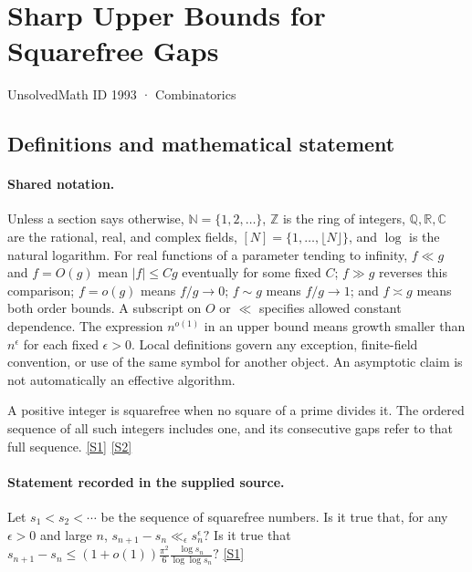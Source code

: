\documentclass[11pt,a4paper]{article}
\newcommand{\N}{\mathbb{N}}
\newcommand{\Z}{\mathbb{Z}}
\newcommand{\Q}{\mathbb{Q}}
\newcommand{\R}{\mathbb{R}}
\newcommand{\C}{\mathbb{C}}
\newcommand{\sref}[2]{\hyperlink{source:#1:#2}{[S#2]}}
\begin{document}

\setcounter{section}{1992}

\section{Sharp Upper Bounds for Squarefree Gaps}\label{1993}

{\small\sffamily UnsolvedMath ID 1993 · Combinatorics}

\subsection{Definitions and mathematical statement}

\paragraph{Shared notation.}Unless a section says otherwise, $\N=\{1,2,\ldots\}$,
$\Z$ is the ring of integers, $\Q,\R,\C$ are the rational, real, and complex
fields, $[N]=\{1,\ldots,\lfloor N\rfloor\}$, and $\log$ is the natural
logarithm. For real functions of a parameter tending to infinity,
$f\ll g$ and $f=O(g)$ mean $|f|\leq Cg$ eventually for some fixed $C$;
$f\gg g$ reverses this comparison; $f=o(g)$ means $f/g\to0$;
$f\sim g$ means $f/g\to1$; and $f\asymp g$ means both order bounds.
A subscript on $O$ or $\ll$ specifies allowed constant dependence.
The expression $n^{o(1)}$ in an upper bound means growth smaller than
$n^\epsilon$ for each fixed $\epsilon>0$. Local definitions govern any
exception, finite-field convention, or use of the same symbol for another
object. An asymptotic claim is not automatically an effective algorithm.



A positive integer is squarefree when no square of a prime divides it. The ordered sequence of all such integers includes one, and its consecutive gaps refer to that full sequence. \sref{1993}{1} \sref{1993}{2}

\paragraph{Statement recorded in the supplied source.}
Let $s_1<s_2<\cdots$ be the sequence of squarefree numbers. Is it true that, for any $\epsilon>0$ and large $n$, $ s_{n+1}-s_n \ll_\epsilon s_n^{\epsilon}? $ Is it true that $ s_{n+1}-s_n \leq (1+o(1))\frac{\pi^2}{6}\frac{\log s_n}{\log\log s_n}? $ \sref{1993}{1}
\end{document}
